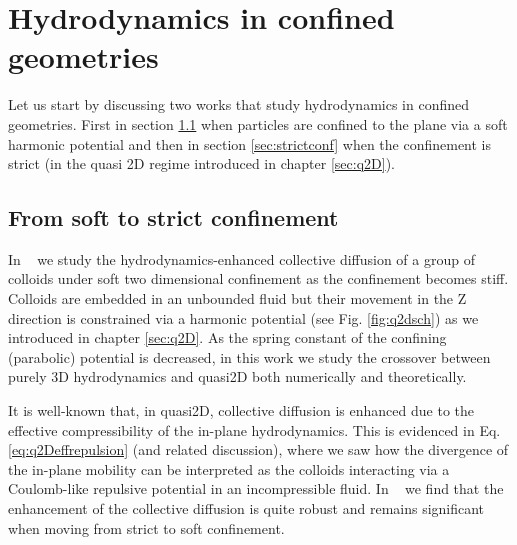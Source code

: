 \documentclass[ twoside,openright,titlepage,numbers=noenddot,%
headinclude,footinclude,cleardoublepage=empty,abstract=on,
BCOR=5mm,paper=b5,fontsize=11pt, dvipsnames
]{scrreprt}
\begin{document}
\chapter{Hydrodynamics in confined geometries}

Let us start by discussing two works that study hydrodynamics in confined geometries. First in section \ref{sec:softconf} when particles are confined to the plane via a soft harmonic potential and then in section \ref{sec:strictconf} when the confinement is strict (in the quasi 2D regime introduced in chapter \ref{sec:q2D}).

\section{From soft to strict confinement}\label{sec:softconf}
In ~\cite{Pelaez2017} we study the hydrodynamics-enhanced collective diffusion of a group of colloids under soft two dimensional confinement as the confinement becomes stiff. Colloids are embedded in an unbounded fluid but their movement in the Z direction is constrained via a harmonic potential (see Fig. \ref{fig:q2dsch}) as we introduced in chapter \ref{sec:q2D}. As the spring constant of the confining (parabolic) potential is decreased, in this work we study the crossover between purely 3D hydrodynamics and quasi2D both numerically and theoretically.

It is well-known that, in quasi2D, collective diffusion is enhanced due to the effective compressibility of the in-plane hydrodynamics. This is evidenced in Eq. \eqref{eq:q2Deffrepulsion} (and related discussion), where we saw how the divergence of the in-plane mobility can be interpreted as the colloids interacting via a Coulomb-like repulsive potential in an incompressible fluid. In ~\cite{Pelaez2017} we find that the enhancement of the collective diffusion is quite robust and remains significant when moving from strict to soft confinement.
\end{document}
